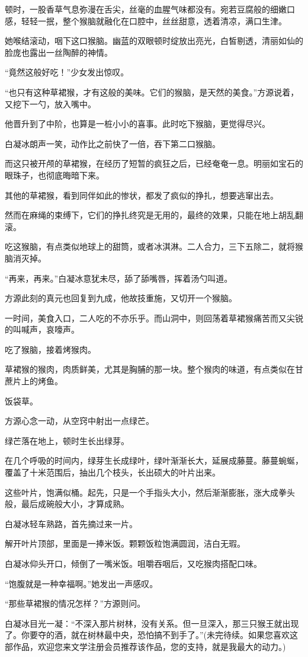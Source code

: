 \begin{this_body}
顿时，一股香草气息弥漫在舌尖，丝毫的血腥气味都没有。宛若豆腐般的细嫩口感，轻轻一抿，整个猴脑就融化在口腔中，丝丝甜意，透着清凉，满口生津。

她喉结滚动，咽下这口猴脑。幽蓝的双眼顿时绽放出亮光，白皙剔透，清丽如仙的脸庞也露出一丝陶醉的神情。

“竟然这般好吃！”少女发出惊叹。

“也只有这种草裙猴，才有这般的美味。它们的猴脑，是天然的美食。”方源说着，又挖下一勺，放入嘴中。

他晋升到了中阶，也算是一桩小小的喜事。此时吃下猴脑，更觉得尽兴。

白凝冰朗声一笑，动作比之前快了一倍，吞下第二口猴脑。

而这只被开颅的草裙猴，在经历了短暂的疯狂之后，已经奄奄一息。明丽如宝石的眼珠子，也彻底晦暗下来。

其他的草裙猴，看到同伴如此的惨状，都发了疯似的挣扎，想要逃窜出去。

然而在麻绳的束缚下，它们的挣扎终究是无用的，最终的效果，只能在地上胡乱翻滚。

吃这猴脑，有点类似地球上的甜筒，或者冰淇淋。二人合力，三下五除二，就将猴脑消灭掉。

“再来，再来。”白凝冰意犹未尽，舔了舔嘴唇，挥着汤勺叫道。

方源此刻的真元也回复到九成，他故技重施，又切开一个猴脑。

一时间，美食入口，二人吃的不亦乐乎。而山洞中，则回荡着草裙猴痛苦而又尖锐的叫喊声，哀嚎声。

吃了猴脑，接着烤猴肉。

草裙猴的猴肉，肉质鲜美，尤其是胸脯的那一块。整个猴肉的味道，有点类似在甘蔗片上的烤鱼。

饭袋草。

方源心念一动，从空窍中射出一点绿芒。

绿芒落在地上，顿时生长出绿芽。

在几个呼吸的时间内，绿芽生长成绿叶，绿叶渐渐长大，延展成藤蔓。藤蔓蜿蜒，覆盖了十米范围后，抽出几个枝头，长出硕大的叶片出来。

这些叶片，饱满似桶。起先，只是一个手指头大小，然后渐渐膨胀，涨大成拳头般，最后成碗般大小，才算成熟。

白凝冰轻车熟路，首先摘过来一片。

解开叶片顶部，里面是一捧米饭。颗颗饭粒饱满圆润，洁白无瑕。

白凝冰仰头开口，倾倒了一嘴米饭。咀嚼吞咽后，又吃猴肉搭配口味。

“饱腹就是一种幸福啊。”她发出一声感叹。

“那些草裙猴的情况怎样？”方源则问。

白凝冰目光一凝：“不深入那片树林，没有关系。但一旦深入，那三只猴王就出现了。你要夺的酒，就在树林最中央，恐怕搞不到手了。”(未完待续。如果您喜欢这部作品，欢迎您来文学注册会员推荐该作品，您的支持，就是我最大的动力。)

\end{this_body}

